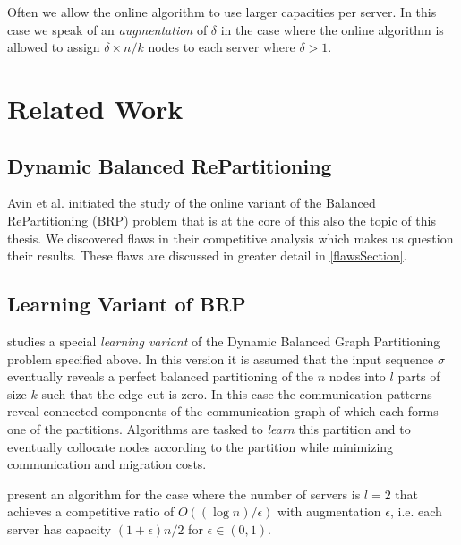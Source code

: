 \documentclass[xcolor=dvipsnames, tikz, 12pt]{article}
\newcommand{\nl}{\newline}
\newcommand{\crep}{C{\scriptsize REP}}
\theoremstyle{definition}
\begin{document}
	Often we allow the online algorithm to use larger capacities per server. In this case we speak of an \textit{augmentation} of $\delta$ in the case where the online algorithm is allowed to assign $\delta\times n/k$ nodes to each server where $\delta>1$.%
	
	\section{Related Work}
	\subsection{Dynamic Balanced RePartitioning}
	Avin et al.\cite{Avin2015a} initiated the study of the online variant of the Balanced RePartitioning (BRP) problem that is at the core of this also the topic of this thesis. We discovered flaws in their competitive analysis which makes us question their results. These flaws are discussed in greater detail in \cref{flawsSection}. %
	
	\subsection{Learning Variant of BRP}
	\cite{Henzinger2019} studies a special \textit{learning variant} of the Dynamic Balanced Graph Partitioning problem specified above. In this version it is assumed that the input sequence $\sigma$ eventually reveals a perfect balanced partitioning of the $n$ nodes into $l$ parts of size $k$ such that the edge cut is zero. In this case the communication patterns reveal connected components of the communication graph of which each forms one of the partitions. Algorithms are tasked to \textit{learn} this partition and to eventually collocate nodes according to the partition while minimizing communication and migration costs.
	
	\cite{Henzinger2019} present an algorithm for the case where the number of servers is $l=2$ that achieves a competitive ratio of $O((\log n)/\epsilon)$ with augmentation $\epsilon$, i.e. each server has capacity $(1+\epsilon)n/2$ for $\epsilon\in(0,1)$.
	
\end{document}
